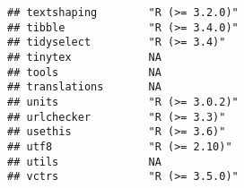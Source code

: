 \documentclass[
]{article}
\begin{document}
\begin{verbatim}
## textshaping        "R (>= 3.2.0)"                                                                                                                                                                                        
## tibble             "R (>= 3.4.0)"                                                                                                                                                                                        
## tidyselect         "R (>= 3.4)"                                                                                                                                                                                          
## tinytex            NA                                                                                                                                                                                                    
## tools              NA                                                                                                                                                                                                    
## translations       NA                                                                                                                                                                                                    
## units              "R (>= 3.0.2)"                                                                                                                                                                                        
## urlchecker         "R (>= 3.3)"                                                                                                                                                                                          
## usethis            "R (>= 3.6)"                                                                                                                                                                                          
## utf8               "R (>= 2.10)"                                                                                                                                                                                         
## utils              NA                                                                                                                                                                                                    
## vctrs              "R (>= 3.5.0)"                                                                                                                                                                                        

\end{verbatim}
\end{document}
